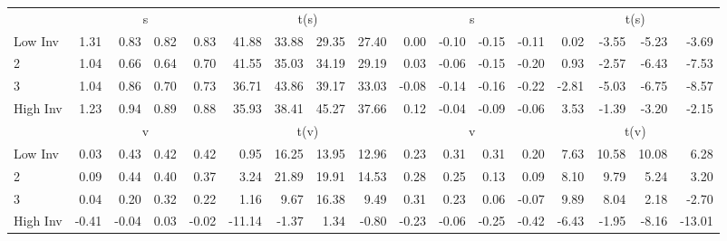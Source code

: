 \begin{table}[!ht]
\begin{tabular}{lrrrrrrrrrrrrrrrr}
  
    
      & \multicolumn{4}{c}{s} & \multicolumn{4}{c}{t(s)}
    
      & \multicolumn{4}{c}{s} & \multicolumn{4}{c}{t(s)}
    
    \\
      \cmidrule(r){2-5} \cmidrule(r){6-9} \cmidrule(r){10-13} \cmidrule(r){14-17}

    Low Inv   & 1.31  & 0.83  & 0.82  & 0.83  & 41.88  & 33.88  & 29.35  & 27.40  & 0.00  & -0.10  & -0.15  & -0.11  & 0.02  & -3.55  & -5.23  & -3.69  \\
           2  & 1.04  & 0.66  & 0.64  & 0.70  & 41.55  & 35.03  & 34.19  & 29.19  & 0.03  & -0.06  & -0.15  & -0.20  & 0.93  & -2.57  & -6.43  & -7.53  \\
           3  & 1.04  & 0.86  & 0.70  & 0.73  & 36.71  & 43.86  & 39.17  & 33.03  & -0.08  & -0.14  & -0.16  & -0.22  & -2.81  & -5.03  & -6.75  & -8.57  \\
    High Inv  & 1.23  & 0.94  & 0.89  & 0.88  & 35.93  & 38.41  & 45.27  & 37.66  & 0.12  & -0.04  & -0.09  & -0.06  & 3.53  & -1.39  & -3.20  & -2.15  \\

  
    
      & \multicolumn{4}{c}{v} & \multicolumn{4}{c}{t(v)}
    
      & \multicolumn{4}{c}{v} & \multicolumn{4}{c}{t(v)}
    
    \\
      \cmidrule(r){2-5} \cmidrule(r){6-9} \cmidrule(r){10-13} \cmidrule(r){14-17}

    Low Inv   & 0.03  & 0.43  & 0.42  & 0.42  & 0.95  & 16.25  & 13.95  & 12.96  & 0.23  & 0.31  & 0.31  & 0.20  & 7.63  & 10.58  & 10.08  & 6.28  \\
           2  & 0.09  & 0.44  & 0.40  & 0.37  & 3.24  & 21.89  & 19.91  & 14.53  & 0.28  & 0.25  & 0.13  & 0.09  & 8.10  & 9.79  & 5.24  & 3.20  \\
           3  & 0.04  & 0.20  & 0.32  & 0.22  & 1.16  & 9.67  & 16.38  & 9.49  & 0.31  & 0.23  & 0.06  & -0.07  & 9.89  & 8.04  & 2.18  & -2.70  \\
    High Inv  & -0.41  & -0.04  & 0.03  & -0.02  & -11.14  & -1.37  & 1.34  & -0.80  & -0.23  & -0.06  & -0.25  & -0.42  & -6.43  & -1.95  & -8.16  & -13.01  \\

  

  \bottomrule
\end{tabular}
\label{tbl:32_Size_OP_Inv_FF1993}
\end{table}